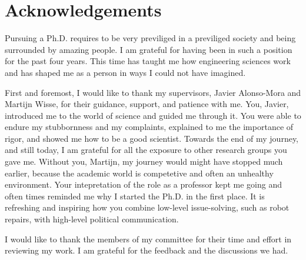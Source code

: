 \chapter*{Acknowledgements}
\label{acknowledgements}

Pursuing a Ph.D. requires to be very previliged in a previliged society and
being surrounded by amazing people. I am grateful for having been in such a
position for the past four years. This time has taught me how engineering
sciences work and has shaped me as a person in ways I could not have imagined.

First and foremost, I would like to thank my supervisors, Javier Alonso-Mora and
Martijn Wisse, for their guidance, support, and patience with me. You, Javier,
introduced me to the world of science and guided me through it. You were able to
endure my stubbornness and my complaints, explained to me the importance of
rigor, and showed me how to be a good scientist.
Towards the end of my
journey, and still today, I am grateful for all the exposure to other research
groups you gave me. Without you, Martijn, my journey would might have stopped
much earlier, because the academic world is competetive and often an unhealthy
environment. Your intepretation of the role as a professor kept me going and
often times reminded me why I started the Ph.D. in the first place. It is
refreshing and inspiring how you combine low-level issue-solving, such as robot
repairs, with high-level political communication.

I would like to thank the members of my committee for their time and effort in
reviewing my work. I am grateful for the feedback and the discussions we had.

